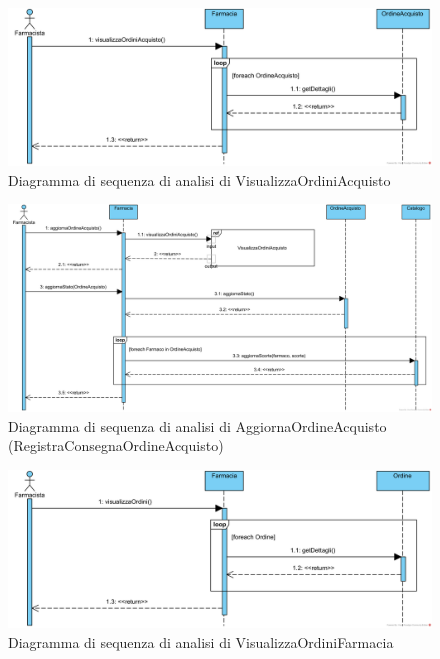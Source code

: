 \begin{figure}[!hbp]
	\centering
	\includegraphics[width=0.9\linewidth]{assets/sequence_analisi/SequenceAnalisiVisualizzaOrdiniAcquisto.png}
	\caption{Diagramma di sequenza di analisi di VisualizzaOrdiniAcquisto}
\end{figure}

\begin{figure}[!hbp]
	\centering
	\includegraphics[width=\linewidth]{assets/sequence_analisi/SequenceAnalisiAggiornaOrdineAcquisto.png}
	\caption{Diagramma di sequenza di analisi di AggiornaOrdineAcquisto (RegistraConsegnaOrdineAcquisto)}
\end{figure}

\begin{figure}[!hbp]
	\centering
	\includegraphics[width=0.9\linewidth]{assets/sequence_analisi/SequenceAnalisiVisualizzaOrdiniFarmacia.png}
	\caption{Diagramma di sequenza di analisi di VisualizzaOrdiniFarmacia}
\end{figure}

